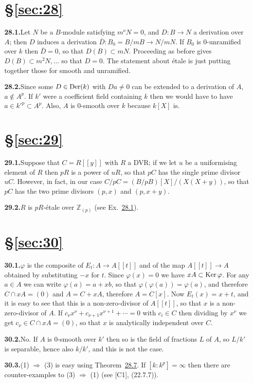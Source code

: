 
\section*{\S\ref{sec:28}}

\noindent\textbf{28.1.}\quad Let $N$ be a $B$-module satisfying $m^\nu N = 0$, and $D\colon B \to N$ a
derivation over $A$; then $D$ induces a derivation $\bar{D}\colon B_0 = B/mB \to N/mN$.
If $B_0$ is 0-unramified over $k$ then $\bar{D} = 0$, so that $D(B) \subset mN$.
Proceeding as before gives $D(B) \subset m^2N, \ldots$ so that $D = 0$. The statement
about \'etale is just putting together those for smooth and unramified.

\noindent\textbf{28.2.}\quad Since some $D \in \operatorname{Der}(k)$ with $Da \ne 0$ can be extended to a derivation
of $A$, $a \notin A^p$. If $k'$ were a coefficient field containing $k$ then we would
have to have $a \in k'^p \subset A^p$. Also, $A$ is 0-smooth over $k$ because
$k[X]$ is.

\section*{\S\ref{sec:29}}

\noindent\textbf{29.1.}\quad Suppose that $C = R[[y]]$ with $R$ a DVR; if we let $u$ be a
uniformising element of $R$ then $pR$ is a power of $uR$, so that $pC$ has the
single prime divisor $uC$. However, in fact, in our case
$C/pC = (B/pB)[X]/(X(X + y))$, so that $pC$ has the two prime divisors $(p, x)$
and $(p, x + y)$.

\noindent\textbf{29.2.}\quad $R$ is $pR$-\'etale over $\mathbb{Z}_{(p)}$ (see Ex.~\hyperref[ex:28.1-ex]{28.1}).

\section*{\S\ref{sec:30}}

\noindent\textbf{30.1.}\quad $\varphi$ is the composite of $E_t\colon A \to A[[t]]$ and of the map
$A[[t]] \to A$ obtained by substituting $-x$ for $t$. Since $\varphi(x) = 0$ we have
$xA \subset \operatorname{Ker} \varphi$. For any $a \in A$ we can write $\varphi(a) = a + xb$, so that
$\varphi(\varphi(a)) = \varphi(a)$, and therefore $C \cap xA = (0)$ and $A = C + xA$,
therefore $A = C[x]$. Now $E_t(x) = x + t$, and it is easy to see that this is a
non-zero-divisor of $A[[t]]$, so that $x$ is a non-zero-divisor of $A$. If
$c_\nu x^\nu + c_{\nu+1}x^{\nu+1} + \cdots = 0$ with $c_i \in C$ then dividing by $x^\nu$ we get
$c_\nu \in C \cap xA = (0)$, so that $x$ is analytically independent over $C$.

\noindent\textbf{30.2.}\quad No. If $A$ is 0-smooth over $k'$ then so is the field of fractions $L$
of $A$, so $L/k'$ is separable, hence also $k/k'$, and this is not the case.

\noindent\textbf{30.3.}\quad (1) $\Rightarrow$ (3) is easy using Theorem~\hyperref[thm:28.7]{28.7}. If
$[k : k^p] = \infty$ then there are counter-examples to (3) $\Rightarrow$ (1) (see [C1],
(22.7.7)).
